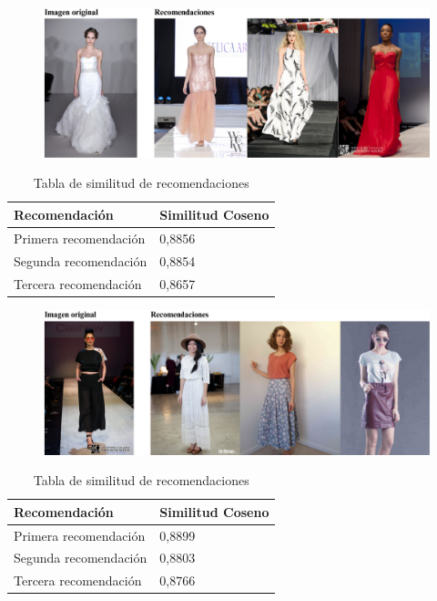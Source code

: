\documentclass[12pt]{report} %
\begin{document}
	\begin{figure}[H]
		{\includegraphics[scale=0.6]{recomendacion3.png}}
	\end{figure}
	\begin{table}[H]
		\centering
		\caption{Tabla de similitud de recomendaciones}
		\begin{tabular}{ll}
				\textbf{Recomendación} & \textbf{Similitud Coseno} \\
				\midrule
				Primera recomendación & 0,8856 \\
				Segunda recomendación & 0,8854 \\
				Tercera recomendación & 0,8657 \\
				\bottomrule
		\end{tabular}
	\end{table}

	\begin{figure}[H]
		{\includegraphics[scale=0.6]{recomendacion4.png}}
	\end{figure}
	\begin{table}[H]
		\centering
		\caption{Tabla de similitud de recomendaciones}
		\begin{tabular}{ll}
				\textbf{Recomendación} & \textbf{Similitud Coseno} \\
				\midrule
				Primera recomendación & 0,8899 \\
				Segunda recomendación & 0,8803 \\
				Tercera recomendación & 0,8766 \\
				\bottomrule
		\end{tabular}
	\end{table}
\end{document}
